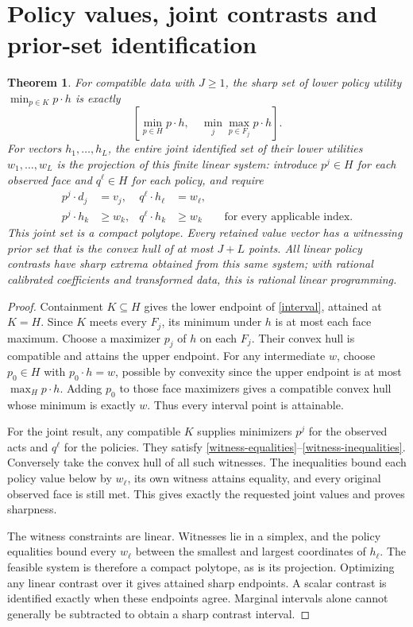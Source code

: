 \documentclass[11pt]{article}
\newtheorem{theorem}{Theorem}
\begin{document}
\section{Policy values, joint contrasts and prior-set identification}
\begin{theorem}\label{policies}
For compatible data with $J\ge1$, the sharp set of lower policy utility $\min_{p\in K}p\cdot h$ is exactly
\begin{equation}\label{interval}
 \left[\min_{p\in H}p\cdot h,\quad
              \min_j\max_{p\in F_j}p\cdot h\right].
\end{equation}
For vectors $h_1,\ldots,h_L$, the entire joint identified set of their lower utilities $w_1,\ldots,w_L$ is the projection of this finite linear system: introduce $p^j\in H$ for each observed face and $q^\ell\in H$ for each policy, and require
\begin{align}
 p^j\cdot d_j&=v_j,& q^\ell\cdot h_\ell&=w_\ell,\label{witness-equalities}\\
 p^j\cdot h_k&\ge w_k,&q^\ell\cdot h_k&\ge w_k
                           &&\text{for every applicable index}.\label{witness-inequalities}
\end{align}
This joint set is a compact polytope. Every retained value vector has a witnessing prior set that is the convex hull of at most $J+L$ points. All linear policy contrasts have sharp extrema obtained from this same system; with rational calibrated coefficients and transformed data, this is rational linear programming.
\end{theorem}
\begin{proof}
Containment $K\subseteq H$ gives the lower endpoint of \eqref{interval}, attained at $K=H$. Since $K$ meets every $F_j$, its minimum under $h$ is at most each face maximum. Choose a maximizer $p_j$ of $h$ on each $F_j$. Their convex hull is compatible and attains the upper endpoint. For any intermediate $w$, choose $p_0\in H$ with $p_0\cdot h=w$, possible by convexity since the upper endpoint is at most $\max_Hp\cdot h$. Adding $p_0$ to those face maximizers gives a compatible convex hull whose minimum is exactly $w$. Thus every interval point is attainable.

For the joint result, any compatible $K$ supplies minimizers $p^j$ for the observed acts and $q^\ell$ for the policies. They satisfy \eqref{witness-equalities}--\eqref{witness-inequalities}. Conversely take the convex hull of all such witnesses. The inequalities bound each policy value below by $w_\ell$, its own witness attains equality, and every original observed face is still met. This gives exactly the requested joint values and proves sharpness.

The witness constraints are linear. Witnesses lie in a simplex, and the policy equalities bound every $w_\ell$ between the smallest and largest coordinates of $h_\ell$. The feasible system is therefore a compact polytope, as is its projection. Optimizing any linear contrast over it gives attained sharp endpoints. A scalar contrast is identified exactly when these endpoints agree. Marginal intervals alone cannot generally be subtracted to obtain a sharp contrast interval.
\end{proof}
\end{document}
